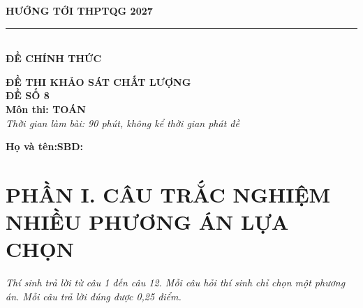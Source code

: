 \documentclass[12pt,a4paper]{article}
\begin{document}
\noindent
\begin{minipage}[t]{0.40\textwidth}
    \centering
    \textbf{HƯỚNG TỚI THPTQG 2027}\\[-2pt]
    \rule{3.2cm}{0.6pt}\\[4pt]
    \textbf{ĐỀ CHÍNH THỨC}
\end{minipage}\hfill
\begin{minipage}[t]{0.58\textwidth}
    \centering
    \textbf{ĐỀ THI KHẢO SÁT CHẤT LƯỢNG}\\
    \textbf{ĐỀ SỐ 8}\\
    \textbf{Môn thi: TOÁN}\\
    \textit{\small Thời gian làm bài: 90 phút, không kể thời gian phát đề}
\end{minipage}

\vspace{0.2cm}
\noindent
\begin{minipage}[b]{0.78\textwidth}
    \textbf{Họ và tên:}\dotfill\textbf{SBD:}\makebox[3.5cm]{\dotfill}
\end{minipage}\hfill
\begin{minipage}[b]{0.20\textwidth}
    \hfill
    \setlength{\fboxrule}{0.8pt}%
\end{minipage}
\vspace{0.2cm}

\section*{\large PHẦN I. CÂU TRẮC NGHIỆM NHIỀU PHƯƠNG ÁN LỰA CHỌN}
\textit{Thí sinh trả lời từ câu 1 đến câu 12. Mỗi câu hỏi thí sinh chỉ chọn một phương án. Mỗi câu trả lời đúng được 0,25 điểm.}
\end{document}
